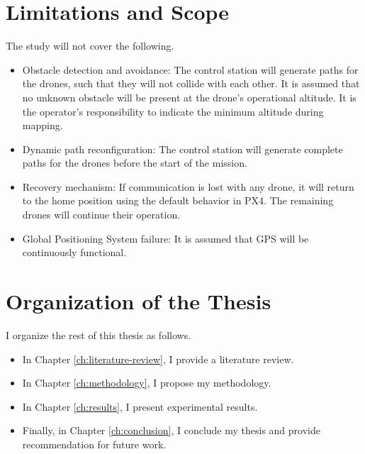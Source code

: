 \section{Limitations and Scope}

The study will not cover the following.
\begin{itemize}
	\item Obstacle detection and avoidance: The control station will generate paths for the drones, such that they will not collide with each other. It is assumed that no unknown obstacle will be present at the drone's operational altitude. It is the operator's responsibility to indicate the minimum altitude during mapping.
	
	\item Dynamic path reconfiguration: The control station will generate complete paths for the drones before the start of the mission.
	
	\item Recovery mechanism: If communication is lost with any drone, it will return to the home position using the default behavior in PX4. The remaining drones will continue their operation.
	
	\item Global Positioning System failure: It is assumed that GPS will be continuously functional.
\end{itemize}

\section{Organization of the Thesis}

I organize the rest of this thesis as follows.
\begin{itemize}
	\item In Chapter \ref{ch:literature-review}, I provide a literature review.
	\item In Chapter \ref{ch:methodology}, I propose my methodology.
	\item In Chapter \ref{ch:results}, I present experimental results.
	\item Finally, in Chapter \ref{ch:conclusion}, I conclude my thesis and provide recommendation for future work.
\end{itemize}

\FloatBarrier
